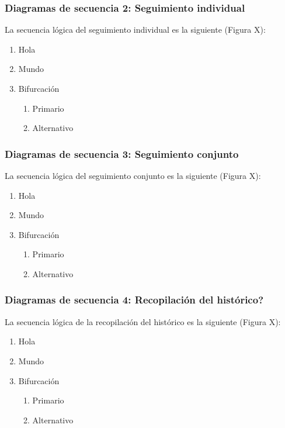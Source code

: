     \subsubsection{Diagramas de secuencia 2: Seguimiento individual}
        La secuencia lógica del seguimiento individual es la siguiente (Figura X):

        \begin{enumerate}
            \item Hola
            \item Mundo
            \item Bifurcación
            \begin{enumerate}
                \item Primario
                \item Alternativo
            \end{enumerate}
        \end{enumerate}
    
    \subsubsection{Diagramas de secuencia 3: Seguimiento conjunto}
        La secuencia lógica del seguimiento conjunto es la siguiente (Figura X):

        \begin{enumerate}
            \item Hola
            \item Mundo
            \item Bifurcación
            \begin{enumerate}
                \item Primario
                \item Alternativo
            \end{enumerate}
        \end{enumerate}
        
    \subsubsection{Diagramas de secuencia 4: Recopilación del histórico?}
        La secuencia lógica de la recopilación del histórico es la siguiente (Figura X):

        \begin{enumerate}
            \item Hola
            \item Mundo
            \item Bifurcación
            \begin{enumerate}
                \item Primario
                \item Alternativo
            \end{enumerate}
        \end{enumerate}

